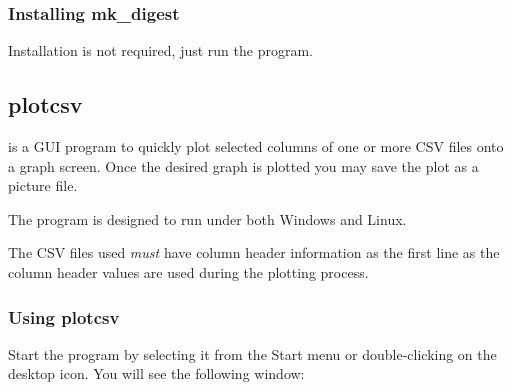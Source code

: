 \documentclass{manual}
\begin{document}
\subsubsection{Installing mk_digest}
\label{subsubsec:mk_digest_install}

Installation is not required, just run the program.

\pagebreak

\subsection{plotcsv}
\label{subsec:plotcsv}

 is a GUI program to quickly plot selected columns of one or more CSV files onto a
graph screen.  Once the desired graph is plotted you may save the plot as a picture file.

The program is designed to run under both Windows and Linux.

The CSV files used \emph{must} have column header information as the first line as the column
header values are used during the plotting process.

\subsubsection{Using plotcsv}
\label{subsubsec:plotcsv_use}

Start the program by selecting it from the Start menu or double-clicking on the desktop icon.
You will see the following window:

\begin{figure}[ht]
  \centerline{}
  \label{fig:winsetpath1}
\end{figure}
\end{document}
